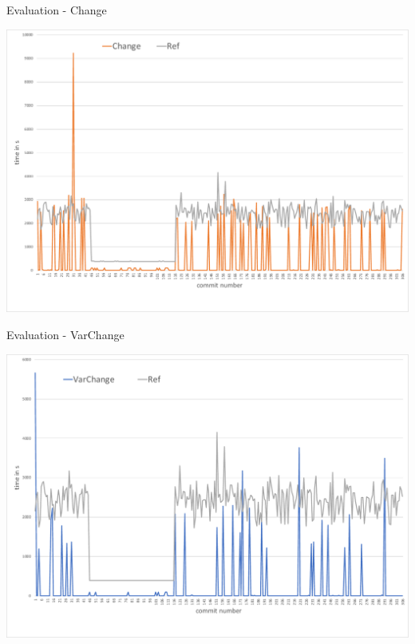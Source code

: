 \documentclass[aspectratio=43, noserifmath]{beamer}
\begin{document}
\begin{frame}{Evaluation - Change}

\includegraphics[width=1\textwidth]{image/change-vs-ref}

\end{frame}

\begin{frame}{Evaluation - VarChange}

\includegraphics[width=1\textwidth]{image/var-change-vs-ref}

\end{frame}
\end{document}
